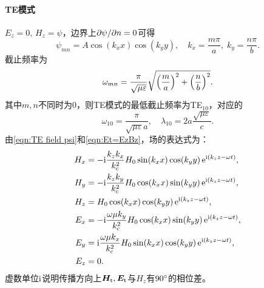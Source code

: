 \paragraph{TE模式}

$E_z=0,\,H_z=\psi$，边界上$\partial\psi/\partial n=0$可得
\begin{equation}
    \psi_{mn}=A\cos(k_xx)\cos(k_yy),\quad k_x=\frac{m\pi}a,\;k_y=\frac{n\pi}b.
\end{equation}
截止频率为
\begin{equation}
    \omega_{mn}=\frac\pi{\sqrt{\mu\varepsilon}}\sqrt{\Bigl(\frac ma\Bigr)^2+\Bigl(\frac nb\Bigr)^2}.
\end{equation}
其中$m,n$不同时为0，则TE模式的最低截止频率为TE$_{10}$，对应的
\[
    \omega_{10}=\frac\pi{\sqrt{\mu\varepsilon}a},\quad\lambda_{10}=2a\frac{\sqrt{\mu\varepsilon}}c.
\]
由\eqref{eqn:TE field psi}和\eqref{eqn:Et=EzBz}，场的表达式为：
\begin{subequations}
    \begin{align}
        H_x&=-\mathrm{i}\frac{k_zk_x}{k_\text c^2}H_0\sin(k_xx)\cos(k_yy)\mathop{}\!\mathrm{e}^{\mathrm{i}(k_zz-\omega t)},\\
        H_y&=-\mathrm{i}\frac{k_zk_y}{k_\text c^2}H_0\cos(k_xx)\sin(k_yy)\mathop{}\!\mathrm{e}^{\mathrm{i}(k_zz-\omega t)},\\
        H_z&=H_0\cos(k_xx)\cos(k_yy)\mathop{}\!\mathrm{e}^{\mathrm{i}(k_zz-\omega t)},\\
        E_x&=-\mathrm{i}\frac{\omega\mu k_y}{k_\text c^2}H_0\cos(k_xx)\sin(k_yy)\mathop{}\!\mathrm{e}^{\mathrm{i}(k_zz-\omega t)},\\
        E_y&=\mathrm{i}\frac{\omega\mu k_x}{k_\text c^2}H_0\sin(k_xx)\cos(k_yy)\mathop{}\!\mathrm{e}^{\mathrm{i}(k_zz-\omega t)},\\
        E_z&=0.
    \end{align}
\end{subequations}
虚数单位$\mathrm{i}$说明传播方向上$\bm H_\text t,\bm E_\text t$与$H_z$有$90^\circ$的相位差。

